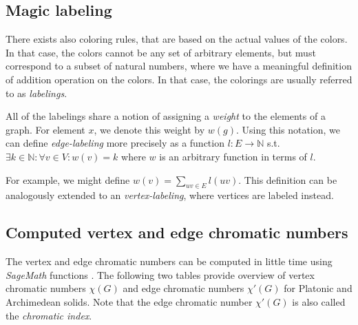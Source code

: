 \begin{highlight}
\subsection{Magic labeling}

There exists also coloring rules, that are based on the actual values of the colors. In that case, the colors cannot be any set of arbitrary elements, but must correspond to a subset of natural numbers, where we have a meaningful definition of addition operation on the colors. In that case, the colorings are usually referred to as \textit{labelings}.

All of the labelings share a notion of assigning a \textit{weight} to the elements of a graph. For element $x$, we denote this weight by $w(g)$. Using this notation, we can define \textit{edge-labeling} more precisely as a function $l:E \rightarrow \mathbb{N}$ s.t. $\exists k \in \mathbb{N} : \forall v \in V:w(v) = k$ where $w$ is an arbitrary function in terms of $l$.

For example, we might define $w(v) = \sum_{uv \in E}l(uv)$.
This definition can be analogously extended to an \textit{vertex-labeling}, where vertices are labeled instead.

\end{highlight}

\vspace{5pt}


\subsection{Computed vertex and edge chromatic numbers}

The vertex and edge chromatic numbers can be computed in little time using \textit{SageMath} functions \cite{sagemath-chromatic-number} \cite{sagemath-chromatic-index}. The following two tables provide overview of vertex chromatic numbers $\chi(G)$  and edge chromatic numbers $\chi'(G)$ for Platonic and Archimedean solids. Note that the edge chromatic number $\chi'(G)$ is also called the \textit{chromatic index}.


